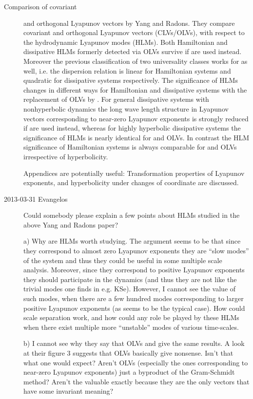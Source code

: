 \begin{description}
\item[Comparison of covariant] and orthogonal {Lyapunov
vectors} by Yang and Radons. They compare
covariant and orthogonal Lyapunov vectors (CLVs/OLVs), with
respect to the hydrodynamic Lyapunov modes (HLMs). Both
Hamiltonian and dissipative HLMs formerly detected via OLVs
survive if {\cLvs} are used instead. Moreover the previous
classification of two universality classes works for {\cLvs} as
well, i.e. the dispersion relation is linear for Hamiltonian
systems and quadratic for dissipative systems respectively.
The significance of HLMs changes in different ways for
Hamiltonian and dissipative systems with the replacement of
OLVs by {\cLvs}. For general dissipative systems with
nonhyperbolic dynamics the long wave length structure in
Lyapunov vectors corresponding to near-zero Lyapunov
exponents is strongly reduced if {\cLvs} are used instead,
whereas for highly hyperbolic dissipative systems the
significance of HLMs is nearly identical for {\cLvs} and OLVs.
In contrast the HLM significance of Hamiltonian systems is
always comparable for {\cLvs} and OLVs irrespective of
hyperbolicity.

Appendices are potentially useful: Transformation properties
of Lyapunov exponents, {\cLvs} and hyperbolicity under changes
of coordinate are discussed.

\item[2013-03-31 Evangelos] Could somebody please explain a few points about HLMs studied
in the above Yang and Radons paper?

a) Why are HLMs worth studying. The argument seems to be that since they correspond to
almost zero Lyapunov exponents they are ``slow modes'' of the system and thus they could be
useful in some multiple scale analysis. Moreover, since they correspond to positive Lyapunov
exponents they should participate in the dynamics (and thus they are not like the trivial
modes one finds in e.g. KSe). However, I cannot see the value of such modes, when there are
a few hundred modes corresponding to larger positive Lyapunov exponents (as seems to be the typical
case). How could scale separation work, and how could any role be played by these HLMs when there
exist multiple more ``unstable'' modes of various time-scales.

b) I cannot see why they say that OLVs and {\cLvs} give the same results. A look at their
figure 3 suggests that OLVs basically give nonsense. Isn't that what one would expect?
Aren't OLVs (especially the ones corresponding to near-zero Lyapunov exponents) just a
byproduct of the Gram-Schmidt method? Aren't the {\cLvs} valuable exactly because they are the
only vectors that have some invariant meaning?


\end{description}
